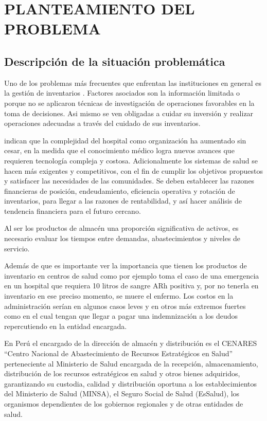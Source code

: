 \newpage
\chapter{PLANTEAMIENTO DEL PROBLEMA}

\section{Descripción de la situación problemática}
Uno de los problemas más frecuentes que enfrentan las instituciones en general es la gestión de inventarios \citep{Flores_Tapia_2023}. Factores asociados son la información limitada o porque no se aplicaron técnicas de investigación de operaciones favorables en la toma de decisiones. Asi mismo se ven obligadas a cuidar su inversión y realizar operaciones adecuadas a través del cuidado de sus inventarios. \citep{Yanque_Vara_2023}

\cite{magalon2016gerencia} indican que la complejidad del hospital como organización ha aumentado sin cesar, en la medida que el conocimiento médico logra nuevos avances que requieren tecnología compleja y costosa. Adicionalmente los sistemas de salud se hacen más exigentes y competitivos, con el fin de cumplir los objetivos propuestos y satisfacer las necesidades de las comunidades. Se deben establecer las razones financieras de posición, endeudamiento, eficiencia operativa y rotación de inventarios, para llegar a las razones de rentabilidad, y así hacer análisis de tendencia financiera para el futuro cercano.

Al ser los productos de almacén una proporción significativa de activos, es necesario evaluar los tiempos entre demandas, abastecimientos y niveles de servicio.

Además de que es importante ver la importancia que tienen los productos de inventario en centros de salud como por ejemplo \cite{prawda2000metodos} toma el caso de una emergencia en un hospital que requiera 10 litros de sangre ARh positiva y, por no tenerla en inventario en ese preciso momento, se muere el enfermo. Los costos en la administración serían en algunos casos leves y en otros más extremos fuertes como en el cual tengan que llegar a pagar una indemnización a los deudos repercutiendo en la entidad encargada.

En Perú el encargado de la dirección de almacén y distribución es el CENARES ``Centro Nacional de Abastecimiento de Recursos Estratégicos en Salud'' perteneciente al Ministerio de Salud encargada de la recepción, almacenamiento, distribución de los recursos estratégicos en salud y otros bienes adquiridos, garantizando su custodia, calidad y distribución oportuna a los establecimientos del Ministerio de Salud (MINSA), el Seguro Social de Salud (EsSalud), los organismos dependientes de los gobiernos regionales y de otras entidades de salud.

